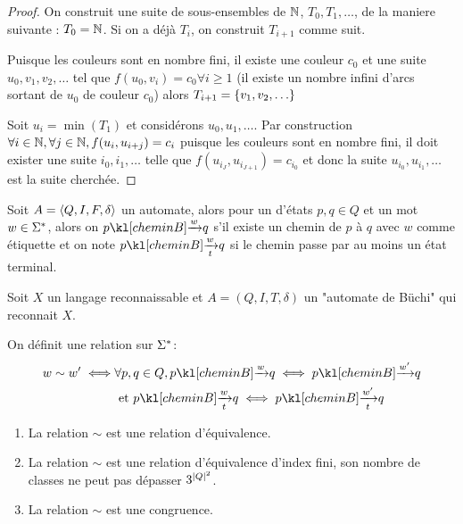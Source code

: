\begin{proof}
	On construit une suite de sous-ensembles de $\mathbb{N}$, $T_0, T_1, \ldots$, de la maniere suivante :
	$T_0 = \mathbb{N}$. Si on a déjà $T_i$, on construit $T_{i+1}$ comme suit.

	Puisque les couleurs sont en nombre fini, il existe une couleur $c_0$ et une suite
	$u_0, v_1, v_2, \ldots$ tel que $f(u_0, v_i) = c_0 \forall i \geq 1$ (il existe un nombre infini d'arcs sortant de $u_0$ de couleur $c_0$)
	alors $T_{i+1} = \left\{v_1, v_2, \ldots\right\}$


	Soit $u_i = \min (T_1)$ et considérons $u_0, u_1, \ldots$. Par construction $\forall i \in \mathbb{N}, \forall j \in \mathbb{N}, f(u_i, u_{i + j}) = c_i$
	puisque les couleurs sont en nombre fini, il doit exister une suite $i_0, i_1, \ldots$ telle que $f(u_{i_J}, u_{i_{J+1}}) = c_{i_0}$
	et donc la suite $u_{i_0},u_{i_1}, \ldots$ est la suite cherchée.
\end{proof}


\begin{notation}
	Soit $A = \langle Q, I, F, \delta \rangle$ un automate, alors pour un d'états $p,q \in Q$ et un mot $w \in \Sigma^{*}$, alors
	on  $\chemin p q w$ s'il existe un chemin de $p$ à $q$ avec $w$ comme étiquette et on note
	$\cheminT p q w$ si le chemin passe par au moins un état terminal.
\end{notation}


\begin{definition}
	Soit $X$ un langage reconnaissable et $A = (Q,I,T,\delta)$ un "automate de Büchi" qui reconnait $X$.

	On définit une relation sur $\Sigma^{*}$:
	\begin{eqnarray*}
		w \sim w' \iff &\forall p,q \in Q, \chemin p q w \iff \chemin p q {w'} \\
		&\et \cheminT p q w \iff \cheminT p q {w'}
	\end{eqnarray*}
\end{definition}

\begin{prop}
	\begin{enumerate}
		\item La relation $\sim$ est une relation d'équivalence.
		\item La relation $\sim$ est une relation d'équivalence d'index fini, son nombre de classes ne peut pas dépasser $3^{{\left|Q\right|}^2}$.
		\item La relation $\sim$ est une congruence.
	\end{enumerate}
\end{prop}

